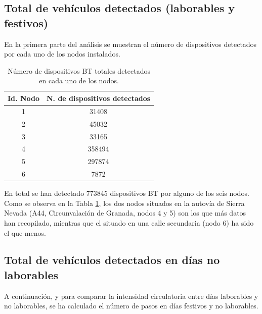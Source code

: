 \documentclass[twocolumn,twoside]{Jornadas}
\begin{document}
\subsection{Total de vehículos detectados (laborables y festivos)}

En la primera parte del análisis se muestran el número de dispositivos detectados por cada uno de los nodos instalados.

 \begin{table}
 \caption{Número de dispositivos BT totales detectados en cada uno de los nodos.
 \label{VehiculosTotales}}
 \begin{center}
 \begin{tabular}{|c|c|}
 \hline
Id. Nodo  &  N. de dispositivos detectados  \\
 \hline
    1     &    31408  \\
 \hline
    2     &    45032  \\
 \hline
    3     &    33165  \\
 \hline
    4     &    358494  \\
 \hline
    5     &    297874  \\
 \hline
    6     &    7872  \\
 \hline
 \end{tabular}
 \end{center}
 \end{table}

En total se han detectado 773845 dispositivos BT por alguno de los seis nodos. 
Como se observa en la Tabla \ref{VehiculosTotales}, los dos nodos situados en la autovía de Sierra Nevada 
(A44, Circunvalación de Granada, nodos 4 y 5) son los que más datos han recopilado, mientras que el situado en una calle 
secundaria (nodo 6) ha sido el que menos.



\subsection{Total de vehículos detectados en días no laborables}

A continuación, y para comparar la intensidad circulatoria entre días laborables y no laborables, se ha calculado el número de pasos en días festivos y no laborables.
\end{document}
